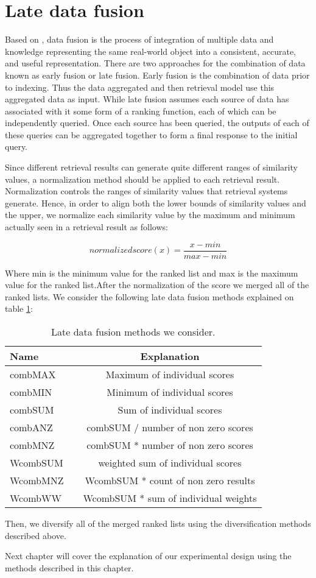 \section{Late data fusion}

Based on \cite{Wilkins}, data fusion is the process of integration of multiple data and knowledge representing the same real-world object into a consistent, accurate, and useful representation. There are two approaches for the combination of data known as early fusion or late fusion. Early fusion is the combination of data prior to indexing. Thus the data aggregated and then retrieval model use this aggregated data as input. While late fusion assumes each source of data has associated with it some form of a ranking function, each of which can be independently queried. Once each source has been queried, the outputs of each of these queries can be aggregated together to form a final response to the initial query.

Since different retrieval results can generate quite different ranges of similarity values, a normalization
method should be applied to each retrieval result. Normalization controls the ranges of similarity values that retrieval systems generate. Hence, in order to align both the lower bounds of similarity values and the upper, we normalize each similarity value
by the maximum and minimum actually seen in a retrieval result as follows:

\begin{equation}
normalized score(x) = \frac{x-min}{max-min}
\end{equation}

Where min is the minimum value for the ranked list and max is the maximum value for the ranked list.After the normalization of the score we merged all of the ranked lists. We consider the following late data fusion methods explained on table \ref{table:LDFmethods}:
\bigskip

\begin{table}[H]
\begin{center}
\caption{Late data fusion methods we consider.}
\label{table:LDFmethods}
\begin{tabular}{lcc}
\midrule
Name &   & Explanation \\
\midrule
combMAX &   & Maximum of individual scores \\
combMIN &   & Minimum of individual scores \\
combSUM &   & Sum of individual scores \\
combANZ &   & combSUM / number of non zero scores \\
combMNZ &   & combSUM * number of non zero scores \\
WcombSUM &   & weighted sum of individual scores \\
WcombMNZ &   & WcombSUM * count of non zero results \\
WcombWW &   & WcombSUM * sum of individual weights \\
\bottomrule
\end{tabular}
\end{center}
\end{table}

Then, we diversify all of the merged ranked lists using the diversification methods described above.

Next chapter will cover the explanation of our experimental design using the methods described in this chapter.